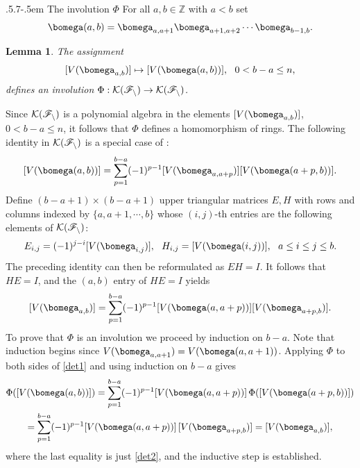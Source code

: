\documentclass[11pt,reqno]{amsart}
\makeatletter
\newtheorem*{lem}{Lemma}
\theoremstyle{definition} \newtheorem*{defn}{Definition}
\theoremstyle{definition}
\newenvironment{pf}{\proof}{\endproof}
\numberwithin{equation}{section}
\def\subsection{\def\@secnumfont{\bfseries}\@startsection{subsection}{2}%
  {\parindent}{.5\linespacing\@plus.7\linespacing}{-.5em}%
  {\normalfont\bfseries}}
\makeatother
\begin{document}
\subsection{The involution $\Phi$}
For all $a,b\in\mathbb Z$ with $a<b$  set
\begin{gather}\label{omegaab}\bomega(a,b)=\bomega_{a,a+1}\bomega_{a+1,a+2}\cdots\bomega_{b-1,b}.\end{gather}
\begin{lem}\label{Phi}
    The assignment $$[V(\bomega_{a,b})]\mapsto [V(\bomega(a,b))],\ \ 0< b-a\le n,$$
defines an involution $\Phi: \cal K(\mathscr F_n)\to \cal K(\mathscr F_n)$.
\end{lem}
\begin{pf} Since $\cal K(\mathscr F_n)$ is a polynomial algebra in the elements $[V(\bomega_{a,b})]$, $0<b-a\le n$, it follows that $\Phi$ defines a homomorphism of rings.
    The following identity in $\cal K(\mathscr F_n)$ is a special case of \cite[Proposition 7.1]{BC25a}:
\begin{equation}\label{det1}[V(\bomega(a,b))]=\sum_{p=1}^{b-a} (-1)^{p-1}[V(\bomega_{a, a+p})][V(\bomega(a+p,b))].\end{equation}
Define $(b-a+1)\times (b-a+1)$ upper triangular matrices $E, H$ with rows and columns indexed by $\{a,a+1,\cdots, b\}$ whose $(i,j)$-th entries are the following elements of $\cal K(\mathscr F_n)$:
 $$E_{i,j}=(-1)^{j-i}[V(\bomega_{i,j})],\ \
H_{i, j}=[V(\bomega(i,j))],\ \ a\le i\le j\le b. $$ The preceding identity can then be reformulated as $EH=I$. It follows that $HE=I$, and the $(a,b)$
entry of $HE=I$ yields
\begin{equation}\label{det2}[V(\bomega_{a,b})]=\sum_{p=1}^{b-a}(-1)^{p-1}[V(\bomega(a, a+p))][V(\bomega_{a+p,b})].\end{equation}
To prove that $\Phi$ is an involution we proceed by induction on $b-a$.   Note that induction begins since  $V(\bomega_{a,a+1})=V(\bomega(a,a+1))$.
Applying $\Phi$ to both sides of \eqref{det1} and using induction on $b-a$ gives
\begin{gather*}\Phi([V(\bomega(a,b))])=\sum_{p=1}^{b-a}(-1)^{p-1}[V(\bomega(a,a+p))]\,\Phi([V(\bomega(a+p,b))])\\
=\sum_{p=1}^{b-a}(-1)^{p-1}[V(\bomega(a,a+p))]\,[V(\bomega_{a+p,b})]=[V(\bomega_{a,b})],\end{gather*} where the last equality is just \eqref{det2}, and the inductive step is established.
\end{pf}
\end{document}
